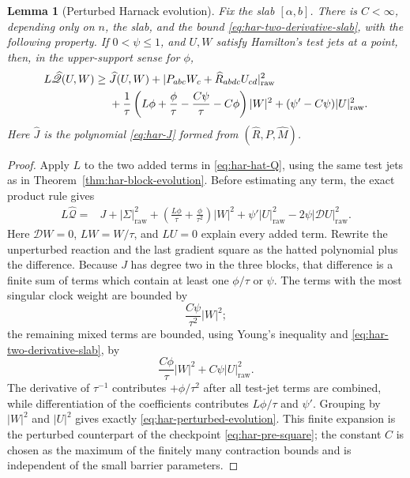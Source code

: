 \documentclass[10pt]{coll-l}
\newtheorem{lemma}[theorem]{Lemma}
\theoremstyle{definition}
\theoremstyle{remark}
\numberwithin{section}{chapter}
\numberwithin{equation}{chapter}
\begin{document}
\begin{lemma}[Perturbed Harnack evolution]
\label{lem:har-perturbed-evolution}
Fix the slab $[\alpha,b]$.  There is $C<\infty$, depending only on $n$, the
slab, and the bound \eqref{eq:har-two-derivative-slab}, with the following
property.  If $0<\psi\leq1$, and $U,W$ satisfy Hamilton's test jets at a
point, then, in the upper-support sense for $\phi$,
\begin{align}
 L\widehat{\mathscr Q}(U,W)\geq{}&
 \widehat J(U,W)
 +|P_{abc}W_c+\widehat R_{abdc}U_{cd}|_{\mathrm{raw}}^2 \notag\\
 &+\frac1\tau
   \left(L\phi+\frac\phi\tau-\frac{C\psi}\tau-C\phi\right)|W|^2
   +(\psi'-C\psi)|U|_{\mathrm{raw}}^2.                 \label{eq:har-perturbed-evolution}
\end{align}
Here $\widehat J$ is the polynomial \eqref{eq:har-J} formed from
$(\widehat R,P,\widehat M)$.
\end{lemma}

\begin{proof}
Apply $L$ to the two added terms in \eqref{eq:har-hat-Q}, using the same test
jets as in Theorem~\ref{thm:har-block-evolution}.  Before estimating any
term, the exact product rule gives
\begin{align}
 L\widehat{\mathscr Q}={}&J+|\Sigma|_{\mathrm{raw}}^2
 +\left(\frac{L\phi}{\tau}+\frac\phi{\tau^2}\right)|W|^2
 +\psi'|U|_{\mathrm{raw}}^2
 -2\psi|\mathcal DU|_{\mathrm{raw}}^2.                  \label{eq:har-exact-hat-before-error}
\end{align}
Here $\mathcal DW=0$, $LW=W/\tau$, and $LU=0$ explain every added term.
Rewrite the unperturbed reaction and the last gradient square as the hatted
polynomial plus the difference.  Because $J$ has
degree two in the three blocks, that difference is a finite sum of terms
which contain at least one $\phi/\tau$ or $\psi$.  The terms with the most
singular clock weight are bounded by
\[
       \frac{C\psi}{\tau^2}|W|^2;
\]
the remaining mixed terms are bounded, using Young's inequality and
\eqref{eq:har-two-derivative-slab}, by
\[
       \frac{C\phi}{\tau}|W|^2+C\psi|U|_{\mathrm{raw}}^2.
\]
The derivative of $\tau^{-1}$ contributes $+\phi/\tau^2$ after all test-jet
terms are combined, while differentiation of the coefficients contributes
$L\phi/\tau$ and $\psi'$.  Grouping by $|W|^2$ and $|U|^2$ gives exactly
\eqref{eq:har-perturbed-evolution}.  This finite expansion is the perturbed
counterpart of the checkpoint \eqref{eq:har-pre-square}; the constant $C$
is chosen as the maximum of the finitely many contraction bounds and is
independent of the small barrier parameters.
\end{proof}
\end{document}
